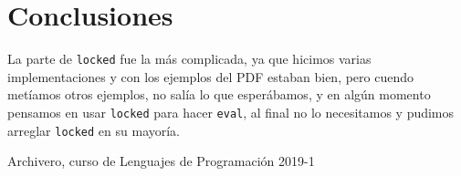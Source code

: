 \documentclass{article}
\begin{document}
\section{Conclusiones}
La parte de \texttt{locked} fue la más complicada, ya que hicimos varias
implementaciones y con los ejemplos del PDF estaban bien, pero cuendo metíamos
otros ejemplos, no salía lo que esperábamos, y en algún momento pensamos en usar
\texttt{locked} para hacer \texttt{eval}, al final no lo necesitamos y pudimos
arreglar \texttt{locked} en su mayoría.

\begin{thebibliography}{9}

  Archivero, curso de Lenguajes de Programación 2019-1

\end{thebibliography}
\end{document}
